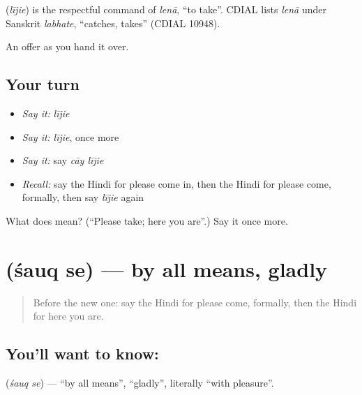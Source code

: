 \begin{cousinweb}
\textbf{} (\emph{lījie}) is the respectful command of \emph{lenā}, \textquotedblleft{}to take\textquotedblright{}. CDIAL lists \emph{lenā} under Sanskrit \emph{labhate}, \textquotedblleft{}catches, takes\textquotedblright{} (CDIAL 10948).
\end{cousinweb}

\begin{grammarlens}[title={What you've built}]
An offer as you hand it over.
\end{grammarlens}

\subsection*{Your turn}
\begin{itemize}
\raggedright
  \item \emph{Say it:} \emph{lījie}
  \item \emph{Say it:} \emph{lījie}, once more
  \item \emph{Say it:} say \emph{cāy lījie}
  \item \emph{Recall:} say the Hindi for please come in, then the Hindi for please come, formally, then say \emph{lījie} again
\end{itemize}

\begin{tcolorbox}[breakable,colback=teal!4,colframe=teal!35!black,title={Before you move on}]
What does  mean? (\textquotedblleft{}Please take; here you are\textquotedblright{}.) Say it once more.
\end{tcolorbox}
\section[\texorpdfstring{\hi{शौक़} \hi{से} (śauq se)}{शौक़ से (śauq se)}]{  (śauq se) — by all means, gladly}

\label{lesson:HI-C115-shauqse}



\begin{quote}
Before the new one: say the Hindi for please come, formally, then the Hindi for here you are.
\end{quote}

\subsection*{You'll want to know:  }
\textbf{ } (\emph{śauq se}) — \textquotedblleft{}by all means\textquotedblright{}, \textquotedblleft{}gladly\textquotedblright{}, literally \textquotedblleft{}with pleasure\textquotedblright{}.

